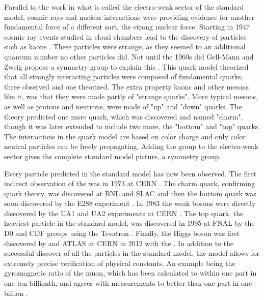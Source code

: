 Parallel to the work in what is called the electro-weak sector of the standard model, cosmic rays and nuclear interactions were providing evidence for another fundamental force of a different sort, the strong nuclear force.  Starting in 1947 cosmic ray events studied in cloud chambers lead to the discovery of particles such as kaons \cite{1947Natur.160..855R}.  These particles were strange, as they seemed to an additional quantum number no other particles did.  Not until the 1960s did Gell-Mann and Zweig propose a symmetry group \SUthree to explain this \cite{osti_4082875} \cite{Zweig:352337}.  This quark model theorized that all strongly interacting particles were composed of fundamental quarks, three observed and one theorized.  The extra property kaons and other mesons like it, was that they were made partly of "strange quarks".  More typical mesons, as well as protons and neutrons, were made of "up" and "down" quarks.  The theory predicted one more quark, which was discovered and named "charm", though it was later extended to include two more, the "bottom" and "top" quarks.  The interactions in the quark model are based on color charge and only color neutral particles can be freely propagating.  Adding the \SUthree group to the electro-weak sector gives the complete standard model picture, a \SUthreeSUtwoUone symmetry group.

Every particle predicted in the standard model has now been observed.  The first indirect observation of the \Z was in 1973 at CERN \cite{HASERT1973121}.  The charm quark, confirming quark theory, was discovered at BNL and SLAC and then the bottom quark was soon discovered by the E288 experiment \cite{Aubert:1974js}\cite{Augustin:1974xw}\cite{Herb:1977ek}.  In 1983 the weak bosons were directly discovered by the UA1 and UA2 experiments at CERN \cite{Arnison:1983mk}\cite{Bagnaia:1983zx}\cite{Arnison:1983rp}\cite{Banner:1983jy}.  The top quark, the heaviest particle in the standard model, was discovered in 1995 at FNAL by the D0 and CDF groups using the Tevatron \cite{d4eca9bf1d5f49f3a4adc794f80c0a00}\cite{Abachi:1994td}.  Finally, the Higgs boson was first discovered by \CMS and ATLAS at CERN in 2012 with the \LHC.  In addition to the successful discover of all the particles in the standard model, the model allows for extremely precise verification of physical constants.  An example being the gyromagnetic ratio of the muon, which has been calculated to within one part in one ten-billionth, and agrees with measurements to better than one part in one billion \cite{PhysRevD.98.030001}.

